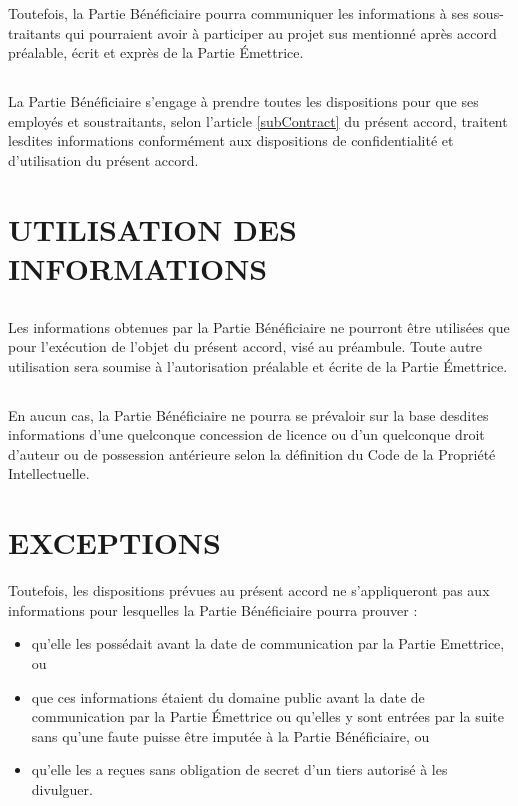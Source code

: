 \documentclass[]{karlito}
\begin{document}
Toutefois, la Partie Bénéficiaire pourra communiquer les informations à ses sous-traitants qui pourraient avoir à participer au projet sus mentionné après accord préalable, écrit et exprès de la Partie Émettrice.

\section{}La Partie Bénéficiaire s’engage à prendre toutes les dispositions pour que ses employés et soustraitants, selon l’article \ref{subContract} du présent accord, traitent lesdites informations conformément aux dispositions de confidentialité et d’utilisation du présent accord.







\chapter{UTILISATION DES INFORMATIONS}
\section{}Les informations obtenues par la Partie Bénéficiaire ne pourront être utilisées que pour l’exécution de l’objet du présent accord, visé au préambule. Toute autre utilisation sera soumise à l’autorisation préalable et écrite de la Partie Émettrice.


\section{}En aucun cas, la Partie Bénéficiaire ne pourra se prévaloir sur la base desdites informations d’une quelconque concession de licence ou d’un quelconque droit d’auteur ou de possession antérieure selon la définition du Code de la Propriété Intellectuelle.



\chapter{EXCEPTIONS}
Toutefois, les dispositions prévues au présent accord ne s’appliqueront pas aux informations pour lesquelles la Partie Bénéficiaire pourra prouver :

\begin{itemize}
 \item qu’elle les possédait avant la date de communication par la Partie Emettrice, ou
 \item que ces informations étaient du domaine public avant la date de communication par la Partie Émettrice ou qu’elles y sont entrées par la suite sans qu’une faute puisse être imputée à la Partie Bénéficiaire, ou
 \item qu’elle les a reçues sans obligation de secret d’un tiers autorisé à les divulguer.
\end{itemize}
\end{document}
